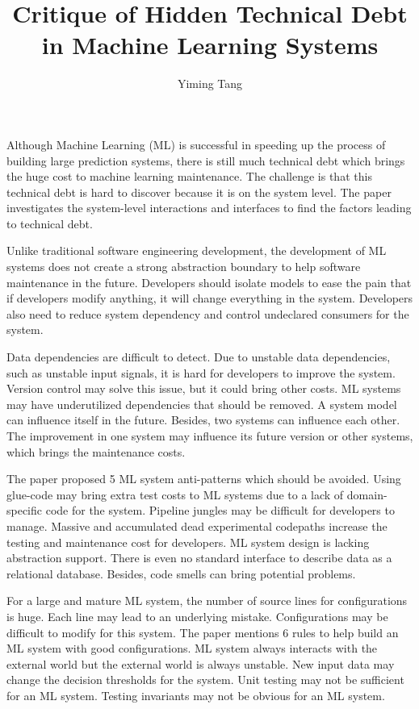 \documentclass[titlepage]{article}
\begin{document}
\title{Critique of Hidden Technical Debt in Machine Learning Systems}
\author{Yiming Tang}
\maketitle

Although Machine Learning (ML) is successful in speeding up the process of building large prediction systems, there is still much technical debt which brings the huge cost to machine learning maintenance. The challenge is that this technical debt is hard to discover because it is on the system level. The paper investigates the system-level interactions and interfaces to find the factors leading to technical debt. 

Unlike traditional software engineering development, the development of ML systems does not create a strong abstraction boundary to help software maintenance in the future. Developers should isolate models to ease the pain that if developers modify anything, it will change everything in the system. Developers also need to reduce system dependency and control undeclared consumers for the system.

Data dependencies are difficult to detect. Due to unstable data dependencies, such as unstable input signals, it is hard for developers to improve the system. Version control may solve this issue, but it could bring other costs. ML systems may have underutilized dependencies that should be removed.
A system model can influence itself in the future. Besides, two systems can influence each other. The improvement in one system may influence its future version or other systems, which brings the maintenance costs.

The paper proposed 5 ML system anti-patterns which should be avoided. Using glue-code may bring extra test costs to ML systems due to a lack of domain-specific code for the system. Pipeline jungles may be difficult for developers to manage. Massive and accumulated dead experimental codepaths increase the testing and maintenance cost for developers. ML system design is lacking abstraction support. There is even no standard interface to describe data as a relational database. Besides, code smells can bring potential problems.

For a large and mature ML system, the number of source lines for configurations is huge. Each line may lead to an underlying mistake. Configurations may be difficult to modify for this system. The paper mentions 6 rules to help build an ML system with good configurations.
ML system always interacts with the external world but the external world is always unstable. New input data may change the decision thresholds for the system. Unit testing may not be sufficient for an ML system. Testing invariants may not be obvious for an ML system.  
\end{document}
